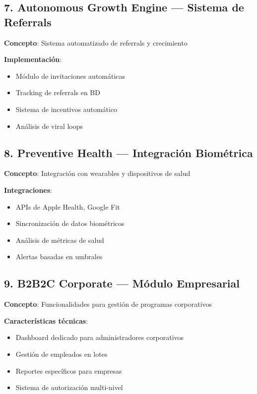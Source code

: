 \documentclass[11pt,a4paper]{article}
\begin{document}
\begin{itemize}
\subsection{7. Autonomous Growth Engine — Sistema de Referrals}

\begin{definicion}
\textbf{Concepto}: Sistema automatizado de referrals y crecimiento
\end{definicion}

\textbf{Implementación}:
\begin{itemize}
    \item Módulo de invitaciones automáticas
    \item Tracking de referrals en BD
    \item Sistema de incentivos automático
    \item Análisis de viral loops
\end{itemize}

\subsection{8. Preventive Health — Integración Biométrica}

\begin{definicion}
\textbf{Concepto}: Integración con wearables y dispositivos de salud
\end{definicion}

\textbf{Integraciones}:
\begin{itemize}
    \item APIs de Apple Health, Google Fit
    \item Sincronización de datos biométricos
    \item Análisis de métricas de salud
    \item Alertas basadas en umbrales
\end{itemize}

\subsection{9. B2B2C Corporate — Módulo Empresarial}

\begin{definicion}
\textbf{Concepto}: Funcionalidades para gestión de programas corporativos
\end{definicion}

\textbf{Características técnicas}:
\begin{itemize}
    \item Dashboard dedicado para administradores corporativos
    \item Gestión de empleados en lotes
    \item Reportes específicos para empresas
    \item Sistema de autorización multi-nivel
\end{itemize}


\end{itemize}
\end{document}
